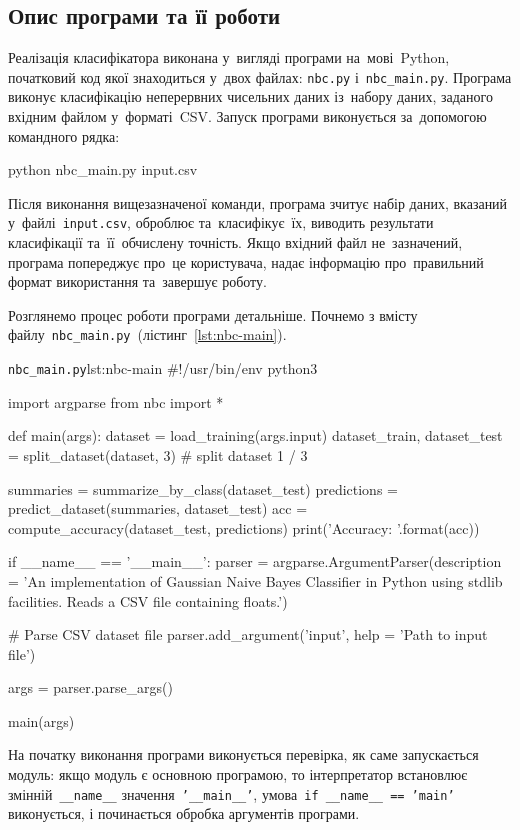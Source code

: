 \documentclass[
	a4paper,
	oneside,
	DIV = 12,
	fontsize = 13pt,
	headings = normal,
	numbers = endperiod,
]{scrartcl}
\theoremstyle{mythm}
\newcommand{\allcaps}[1]{{\addfontfeatures{LetterSpace = 8, Kerning = Off}#1}}
\newcommand{\filename}[1]{\texttt{#1}}
\begin{document}
		\subsection{Опис програми та її роботи}
			Реалізація класифікатора виконана у~вигляді програми на~мові~\textenglish{Python}, початковий код якої знаходиться у~двох файлах: \filename{nbc.py} і~\filename{nbc\_main.py}. Програма виконує класифікацію неперервних чисельних даних із~набору даних, заданого вхідним файлом у~форматі~\textenglish{\allcaps{CSV}}. Запуск програми виконується за~допомогою командного рядка:
			\begin{bashcode}
				python nbc_main.py input.csv
			\end{bashcode}
			Після виконання вищезазначеної команди, програма зчитує набір даних, вказаний у~файлі~\filename{input.csv}, оброблює та~класифікує~їх, виводить результати класифікації та~її~обчислену точність. Якщо вхідний файл не~зазначений, програма попереджує про~це користувача, надає інформацію про~правильний формат використання та~завершує роботу.

			Розглянемо процес роботи програми детальніше. Почнемо з вмісту файлу~\filename{nbc\_main.py}~(лістинг~\ref{lst:nbc-main}).
			\begin{listingpython}{\filename{nbc\_main.py}}{lst:nbc-main}
				#!/usr/bin/env python3

				import argparse
				from nbc import *

				def main(args):
						dataset = load_training(args.input)
						dataset_train, dataset_test = split_dataset(dataset, 3) # split dataset 1 / 3

						summaries = summarize_by_class(dataset_test)
						predictions = predict_dataset(summaries, dataset_test)
						acc = compute_accuracy(dataset_test, predictions)
						print('Accuracy: {}'.format(acc))

				if __name__ == '__main__':
						parser = argparse.ArgumentParser(description = 'An implementation of Gaussian Naive Bayes Classifier in Python using stdlib facilities. Reads a CSV file containing floats.')

						# Parse CSV dataset file
						parser.add_argument('input', help = 'Path to input file')
						
						args = parser.parse_args()

						main(args)
			\end{listingpython}
			На початку виконання програми виконується перевірка, як саме запускається модуль: якщо модуль є основною програмою, то інтерпретатор встановлює змінній~\texttt{__name__} значення~\texttt{'__main__'}, умова~\texttt{if __name__ == 'main'} виконується, і починається обробка аргументів програми.

	\newpage

	\newpage
	\printbibliography
\end{document}
